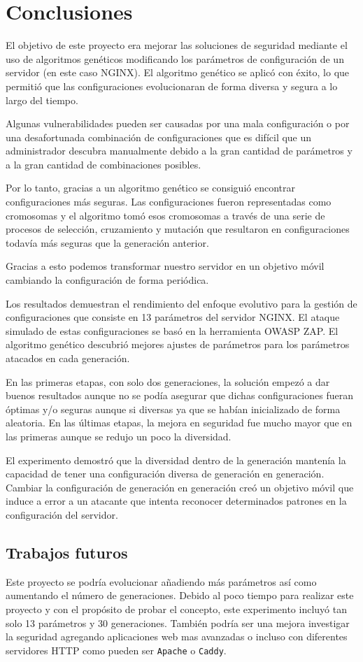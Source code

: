 \chapter{Conclusiones}

El objetivo de este proyecto era mejorar las soluciones de seguridad mediante el uso de algoritmos genéticos modificando los parámetros de configuración de un servidor (en este caso NGINX). El algoritmo genético se aplicó con éxito, lo que permitió que las configuraciones evolucionaran de forma diversa y segura a lo largo del tiempo.

\bigskip
Algunas vulnerabilidades pueden ser causadas por una mala configuración o por una desafortunada combinación de configuraciones que es difícil que un administrador descubra manualmente debido a la gran cantidad de parámetros y a la gran cantidad de combinaciones posibles.

\bigskip
Por lo tanto, gracias a un algoritmo genético se consiguió encontrar configuraciones más seguras. Las configuraciones fueron representadas como cromosomas y el algoritmo tomó esos cromosomas a través de una serie de procesos de selección, cruzamiento y mutación que resultaron en configuraciones todavía más seguras que la generación anterior.

\bigskip
Gracias a esto podemos transformar nuestro servidor en un objetivo móvil cambiando la configuración de forma periódica.

\bigskip
Los resultados demuestran el rendimiento del enfoque evolutivo para la gestión de configuraciones que consiste en 13 parámetros del servidor NGINX. El ataque simulado de estas configuraciones se basó en la herramienta OWASP ZAP. El algoritmo genético descubrió mejores ajustes de parámetros para los parámetros atacados en cada generación.

\bigskip
En las primeras etapas, con solo dos generaciones, la solución empezó a dar buenos resultados aunque no se podía asegurar que dichas configuraciones fueran óptimas y/o seguras aunque si diversas ya que se habían inicializado de forma aleatoria. En las últimas etapas, la mejora en seguridad fue mucho mayor que en las primeras aunque se redujo un poco la diversidad.

\bigskip
El experimento demostró que la diversidad dentro de la generación mantenía la capacidad de tener una configuración diversa de generación en generación. Cambiar la configuración de generación en generación creó un objetivo móvil que induce a error a un atacante que intenta reconocer determinados patrones en la configuración del servidor.

\section{Trabajos futuros}
Este proyecto se podría evolucionar añadiendo más parámetros así como aumentando el número de generaciones. Debido al poco tiempo para realizar este proyecto y con el propósito de probar el concepto, este experimento incluyó tan solo 13 parámetros y 30 generaciones. También podría ser una mejora investigar la seguridad agregando aplicaciones web mas avanzadas o incluso con diferentes servidores HTTP como pueden ser  \texttt{Apache} o \texttt{Caddy}.
